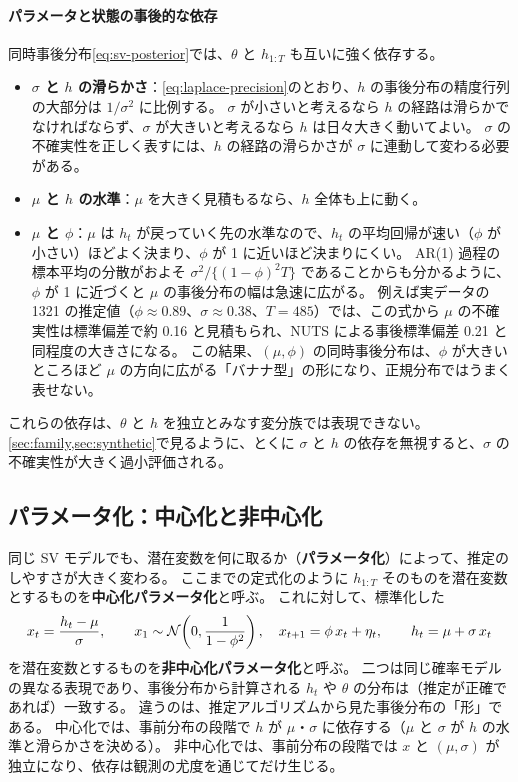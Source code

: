 \paragraph{パラメータと状態の事後的な依存}
同時事後分布\cref{eq:sv-posterior}では、$\theta$ と $h_{1:T}$ も互いに強く依存する。
\begin{itemize}
  \item \textbf{$\sigma$ と $h$ の滑らかさ}：\cref{eq:laplace-precision}のとおり、$h$ の事後分布の精度行列の大部分は $1/\sigma^2$ に比例する。
    $\sigma$ が小さいと考えるなら $h$ の経路は滑らかでなければならず、$\sigma$ が大きいと考えるなら $h$ は日々大きく動いてよい。
    $\sigma$ の不確実性を正しく表すには、$h$ の経路の滑らかさが $\sigma$ に連動して変わる必要がある。
  \item \textbf{$\mu$ と $h$ の水準}：$\mu$ を大きく見積もるなら、$h$ 全体も上に動く。
  \item \textbf{$\mu$ と $\phi$}：$\mu$ は $h_t$ が戻っていく先の水準なので、$h_t$ の平均回帰が速い（$\phi$ が小さい）ほどよく決まり、$\phi$ が 1 に近いほど決まりにくい。
    AR(1) 過程の標本平均の分散がおよそ $\sigma^2 / \{(1-\phi)^2 T\}$ であることからも分かるように、$\phi$ が 1 に近づくと $\mu$ の事後分布の幅は急速に広がる。
    例えば実データの 1321 の推定値（$\phi \approx 0.89$、$\sigma \approx 0.38$、$T = 485$）では、この式から $\mu$ の不確実性は標準偏差で約 0.16 と見積もられ、NUTS による事後標準偏差 0.21 と同程度の大きさになる。
    この結果、$(\mu, \phi)$ の同時事後分布は、$\phi$ が大きいところほど $\mu$ の方向に広がる「バナナ型」の形になり、正規分布ではうまく表せない。
\end{itemize}
これらの依存は、$\theta$ と $h$ を独立とみなす変分族では表現できない。
\cref{sec:family,sec:synthetic}で見るように、とくに $\sigma$ と $h$ の依存を無視すると、$\sigma$ の不確実性が大きく過小評価される。

\subsection{パラメータ化：中心化と非中心化}\label{sec:model-param}

同じ SV モデルでも、潜在変数を何に取るか（\textbf{パラメータ化}）によって、推定のしやすさが大きく変わる。
ここまでの定式化のように $h_{1:T}$ そのものを潜在変数とするものを\textbf{中心化パラメータ化}と呼ぶ。
これに対して、標準化した
\[
  x_t = \frac{h_t - \mu}{\sigma}, \qquad
  x_1 \sim \mathcal{N}\!\left(0, \frac{1}{1-\phi^2}\right), \quad x_{t+1} = \phi\, x_t + \eta_t, \qquad h_t = \mu + \sigma\, x_t
\]
を潜在変数とするものを\textbf{非中心化パラメータ化}と呼ぶ。
二つは同じ確率モデルの異なる表現であり、事後分布から計算される $h_t$ や $\theta$ の分布は（推定が正確であれば）一致する。
違うのは、推定アルゴリズムから見た事後分布の「形」である。
中心化では、事前分布の段階で $h$ が $\mu$・$\sigma$ に依存する（$\mu$ と $\sigma$ が $h$ の水準と滑らかさを決める）。
非中心化では、事前分布の段階では $x$ と $(\mu, \sigma)$ が独立になり、依存は観測の尤度を通じてだけ生じる。

